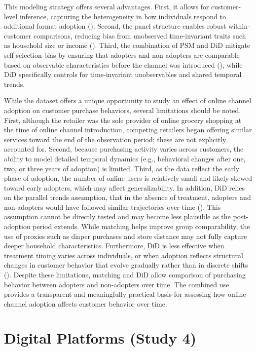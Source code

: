 This modeling strategy offers several advantages. First, it allows for customer-level inference, capturing the heterogeneity in how individuals respond to additional format adoption (\cite{Kushwaha2013-iu}). Second, the panel structure enables robust within-customer comparisons, reducing bias from unobserved time-invariant traits such as household size or income (\cite{Konus2008-mp}). Third, the combination of PSM and DiD mitigate self-selection bias by ensuring that adopters and non-adopters are comparable based on observable characteristics before the channel was introduced (\cite{Li2015-tq}), while DiD specifically controls for time-invariant unobservables and shared temporal trends.

While the dataset offers a unique opportunity to study an effect of online channel adoption on customer purchase behaviors, several limitations should be noted. First, although the retailer was the sole provider of online grocery shopping at the time of online channel introduction, competing retailers began offering similar services toward the end of the observation period; these are not explicitly accounted for. Second, because purchasing activity varies across customers, the ability to model detailed temporal dynamics (e.g., behavioral changes after one, two, or three years of adoption) is limited. Third, as the data reflect the early phase of adoption, the number of online users is relatively small and likely skewed toward early adopters, which may affect generalizability. In addition, DiD relies on the parallel trends assumption, that in the absence of treatment, adopters and non-adopters would have followed similar trajectories over time (\cite{Li2023-ho}). This assumption cannot be directly tested and may become less plausible as the post-adoption period extends. While matching helps improve group comparability, the use of proxies such as diaper purchases and store distance may not fully capture deeper household characteristics. Furthermore, DiD is less effective when treatment timing varies across individuals, or when adoption reflects structural changes in customer behavior that evolve gradually rather than in discrete shifts (\cite{Roth2023-xe}). Despite these limitations, matching and DiD allow comparison of purchasing behavior between adopters and non-adopters over time. The combined use provides a transparent and meaningfully practical basis for assessing how online channel adoption affects customer behavior over time.

\section{Digital Platforms (Study 4)}

